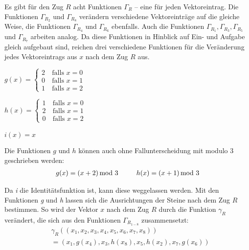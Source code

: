 \documentclass[12pt,a4paper, usenames, dvipsnames]{article}
\theoremstyle{mystyle}
\theoremstyle{definition}
\begin{document}
Es gibt für den Zug $R$ acht Funktionen $\Gamma_R$ -- eine für jeden Vektoreintrag. Die Funktionen $\Gamma_{R_2}$ und $\Gamma_{R_8}$ verändern verschiedene Vektoreinträge auf die gleiche Weise, die Funktionen $\Gamma_{R_4}$ und $\Gamma_{R_6}$ ebenfalls. Auch die Funktionen $\Gamma_{R_1}, \Gamma_{R_3}, \Gamma_{R_5}$ und $\Gamma_{R_7}$ arbeiten analog. Da diese Funktionen in Hinblick auf Ein- und Aufgabe gleich aufgebaut sind, reichen drei verschiedene Funktionen für die Veränderung jedes Vektoreintrags aus $x$ nach dem Zug $R$ aus.
\\

\begin{minipage}{0.35\textwidth}
\centering
$g(x)= \begin{cases}
2 & \ \text{falls } x = 0 \\ 
0 & \ \text{falls } x = 1 \\
1 & \ \text{falls } x = 2 
\end{cases}$
\end{minipage}
\begin{minipage}{0.35\textwidth}
\centering
$h(x)= \begin{cases}
1 & \ \text{falls } x = 0 \\ 
2 & \ \text{falls } x = 1 \\
0 & \ \text{falls } x = 2 
\end{cases}$
\end{minipage}
\begin{minipage}{0.3\textwidth}
\centering
$i(x) = x$
\end{minipage}
\vspace*{1em}

Die Funktionen $g$ und $h$ können auch ohne Fallunterscheidung mit modulo 3 geschrieben werden:
\begin{align*}
g(x)=(x+2) \hspace*{-0.5em} \mod 3 \ \ \ \ \ \ \ \ h(x) = (x+1) \hspace*{-0.5em} \mod 3
\end{align*}

Da \textit{i} die Identitätsfunktion ist, kann diese weggelassen werden.
Mit den Funktionen \textit{g} und \textit{h} lassen sich die Ausrichtungen der Steine nach dem Zug $R$ bestimmen. So wird der Vektor $x$ nach dem Zug $R$ durch die Funktion $\gamma_R$ verändert, die sich aus den Funktionen $\Gamma_{R_{1-8}}$ zusammensetzt:
\begin{align*}
& \gamma_R \left( (x_1, x_2, x_3, x_4, x_5, x_6, x_7, x_8  ) \right) \\ 
& =  \left( x_1, g(x_4), x_3, h(x_8), x_5, h(x_2), x_7, g(x_6) \right)
\end{align*}
\end{document}
